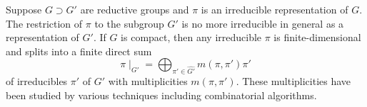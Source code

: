 \documentclass[reqno,12pt]{pja00} %
\theoremstyle{definition}
\theoremstyle{exampstyle} \newtheorem{examp}[theorem]{Theorem}
\begin{document}
Suppose $G \supset G'$ are reductive groups and $\pi$ is an irreducible
representation of $G$. 
The restriction of $\pi$ to the subgroup $G'$ is no more irreducible in general as a representation
of $G'$. If $G$ is compact, then any irreducible $\pi$ is finite-dimensional and splits
into a finite direct sum
\[ \pi\!\mid_{G'} = \bigoplus_{\pi' \in \widehat{G'}} m (\pi, \pi') \pi' \]
of irreducibles $\pi'$ of $G'$ with multiplicities $m(\pi,\pi')$. These multiplicities have been studied
by various techniques including combinatorial algorithms.
\end{document}
